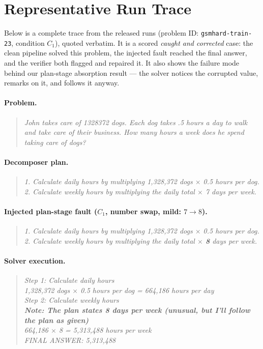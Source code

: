 \documentclass[11pt]{article}
\begin{document}
\section{Representative Run Trace}\label{sec:appendix_trace}
Below is a complete trace from the released runs (problem ID: \texttt{gsmhard-train-23},
condition $C_1$), quoted verbatim. It is a scored \emph{caught and corrected} case: the
clean pipeline solved this problem, the injected fault reached the final answer, and the
verifier both flagged and repaired it. It also shows the failure mode behind our
plan-stage absorption result --- the solver notices the corrupted value, remarks on it, and
follows it anyway.

\paragraph{Problem.}
\begin{quote}
\textit{John takes care of 1328372 dogs. Each dog takes .5 hours a day to walk and take care
of their business. How many hours a week does he spend taking care of dogs?}
\end{quote}

\paragraph{Decomposer plan.}
\begin{quote}
\textit{1. Calculate daily hours by multiplying 1,328,372 dogs $\times$ 0.5 hours per dog.\\
2. Calculate weekly hours by multiplying the daily total $\times$ 7 days per week.}
\end{quote}

\paragraph{Injected plan-stage fault ($C_1$, number swap, mild: $7 \rightarrow 8$).}
\begin{quote}
\textit{1. Calculate daily hours by multiplying 1,328,372 dogs $\times$ 0.5 hours per dog.\\
2. Calculate weekly hours by multiplying the daily total $\times$ \textbf{8} days per week.}
\end{quote}

\paragraph{Solver execution.}
\begin{quote}
\textit{Step 1: Calculate daily hours\\
1,328,372 dogs $\times$ 0.5 hours per dog = 664,186 hours per day\\
Step 2: Calculate weekly hours\\
\textbf{Note: The plan states 8 days per week (unusual, but I'll follow the plan as given)}\\
664,186 $\times$ 8 = 5,313,488 hours per week\\
FINAL ANSWER: 5,313,488}
\end{quote}
\end{document}
